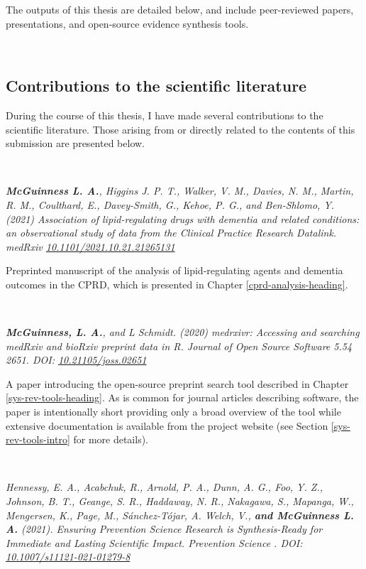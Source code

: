\documentclass[a4paper, twoside]{templates/ociamthesis}
\begin{document}
The outputs of this thesis are detailed below, and include peer-reviewed papers, presentations, and open-source evidence synthesis tools.

~

\hypertarget{literature-contributions}{%
\subsection{Contributions to the scientific literature}\label{literature-contributions}}

During the course of this thesis, I have made several contributions to the scientific literature. Those arising from or directly related to the contents of this submission are presented below.

~

\emph{\textbf{McGuinness L. A.}, Higgins J. P. T., Walker, V. M., Davies, N. M., Martin, R. M., Coulthard, E., Davey-Smith, G., Kehoe, P. G., and Ben-Shlomo, Y. (2021) Association of lipid-regulating drugs with dementia and related conditions: an observational study of data from the Clinical Practice Research Datalink. medRxiv \href{https://doi.org/10.1101/2021.10.21.21265131}{10.1101/2021.10.21.21265131}}

Preprinted manuscript of the analysis of lipid-regulating agents and dementia outcomes in the CPRD, which is presented in Chapter \ref{cprd-analysis-heading}.

~

\emph{\textbf{McGuinness, L. A.}, and L Schmidt. (2020) medrxivr: Accessing and searching medRxiv and bioRxiv preprint data in R. Journal of Open Source Software 5.54 2651. DOI: \href{https://doi.org/10.21105/joss.02651}{10.21105/joss.02651}}

A paper introducing the open-source preprint search tool described in Chapter \ref{sys-rev-tools-heading}. As is common for journal articles describing software, the paper is intentionally short providing only a broad overview of the tool while extensive documentation is available from the project website (see Section \ref{sys-rev-tools-intro} for more details).

~

\emph{Hennessy, E. A., Acabchuk, R., Arnold, P. A., Dunn, A. G., Foo, Y. Z., Johnson, B. T., Geange, S. R., Haddaway, N. R., Nakagawa, S., Mapanga, W., Mengersen, K., Page, M., Sánchez-Tójar, A. Welch, V., \textbf{and McGuinness L. A.} (2021). Ensuring Prevention Science Research is Synthesis-Ready for Immediate and Lasting Scientific Impact. Prevention Science . DOI: \href{https://doi.org/10.1007/s11121-021-01279-8}{10.1007/s11121-021-01279-8}}
\end{document}
